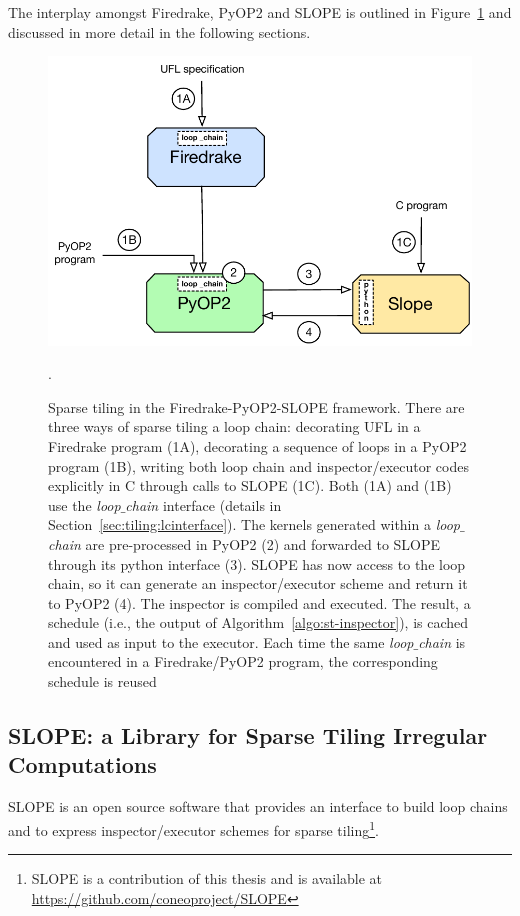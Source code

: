 The interplay amongst Firedrake, PyOP2 and SLOPE is outlined in Figure~\ref{fig:st-implementation} and discussed in more detail in the following sections.

\begin{figure}[htpb]
\centering
\includegraphics[scale=0.6]{sparsetiling/figures/firedrake-pyop2-slope.pdf}
\caption{Sparse tiling in the Firedrake-PyOP2-SLOPE framework. There are three ways of sparse tiling a loop chain: decorating UFL in a Firedrake program (1A), decorating a sequence of loops in a PyOP2 program (1B), writing both loop chain and inspector/executor codes explicitly in C through calls to SLOPE (1C). Both (1A) and (1B) use the {\em loop$\_$chain} interface (details in Section~\ref{sec:tiling:lcinterface}). The kernels generated within a {\em loop$\_$chain} are pre-processed in PyOP2 (2) and forwarded to SLOPE through its python interface (3). SLOPE has now access to the loop chain, so it can generate an inspector/executor scheme and return it to PyOP2 (4). The inspector is compiled and executed. The result, a schedule (i.e., the output of Algorithm~\ref{algo:st-inspector}), is cached and used as input to the executor. Each time the same {\em loop$\_$chain} is encountered in a Firedrake/PyOP2 program, the corresponding schedule is reused}.
\label{fig:st-implementation}
\end{figure}

\subsection{SLOPE: a Library for Sparse Tiling Irregular Computations}
\label{sec:tiling:impl-slope}
SLOPE is an open source software that provides an interface to build loop chains and to express inspector/executor schemes for sparse tiling\footnote{SLOPE is a contribution of this thesis and is available at \url{https://github.com/coneoproject/SLOPE}}. 

